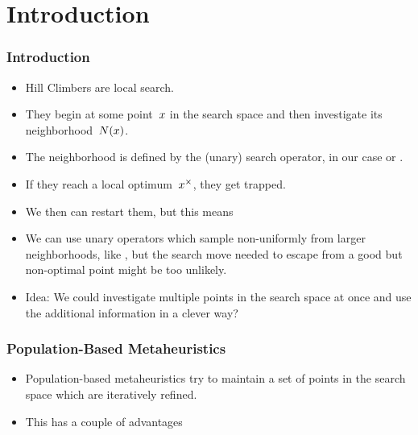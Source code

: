\documentclass[mathserif]{beamer}%
\subtitle{6. Evolutionary Algorithms}%
\begin{document}
%
\startPresentation%
%
\section{Introduction}%
%
\begin{frame}%
\frametitle{Introduction}%
\begin{itemize}%
\item Hill Climbers are local search.%
\item<2-> They begin at some point~$x$ in the search space and then investigate its neighborhood~$N(x)$.%
\item<3-> The neighborhood is defined by the (unary) search operator, in our case  or .%
\item<4-> If they reach a local optimum~$x^{\times}$, they get trapped.%
\item<5-> We then can restart them, but this means%
\item<7-> We can use unary operators which sample non-uniformly from larger neighborhoods, like , but the search move needed to escape from a good but non-optimal point might be too unlikely.%
\item<8-> Idea: We could investigate multiple points in the search space at once and use the additional information in a clever way?%
\end{itemize}%
\end{frame}%
%
%
\begin{frame}%
\frametitle{Population-Based Metaheuristics}%
\begin{itemize}%
\item Population-based metaheuristics\cite{WGOEB,H1975GA,BFM1997EA,MF2004HTSIMH,G1989GA} try to maintain a \alert{set} of points in the search space which are iteratively refined.%
\item<2-> This has a couple of advantages%
\end{itemize}%
\end{frame}%
%
\end{document}
